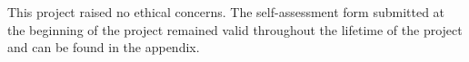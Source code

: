 This project raised no ethical concerns. The self-assessment form submitted at the beginning of the project remained valid throughout the lifetime of the project and can be found in the appendix.
